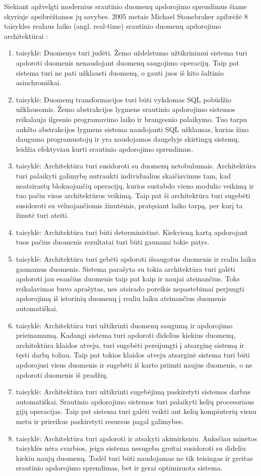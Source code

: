 \documentclass{VUMIFPSbakalaurinis}
\begin{document}
Siekiant apžvelgti modernius srautinio duomenų apdorojimo sprendimus šiame skyriuje apsibrėžiamos jų savybes.
2005 metais Michael Stonebraker apibrėžė 8 taisykles realaus laiko (angl. real-time) srautinio duomenų apdorojimo architektūrai \cite{stonebraker20058}:
\begin{enumerate}[label=\arabic*]
    \item taisyklė: Duomenys turi judėti. Žemo uždelstumo užtikrinimui sistema turi apdoroti duomenis nenaudojant duomenų saugojimo operacijų. 
    Taip pat sistema turi ne pati užklausti duomenų, o gauti juos iš kito šaltinio asinchroniškai. 
    \item taisyklė: Duomenų transformacijos turi būti vykdomas SQL pobūdžio užklausomis. Žemo abstrakcijos lygmens srautinio apdorojimo sistemos reikalauja ilgesnio programavimo laiko ir brangesnio palaikymo. Tuo tarpu aukšto abstrakcijos lygmens sistema naudojanti SQL užklausas, kurias žino dauguma programuotojų ir yra naudojamos daugelyje skirtingų sistemų, leidžia efektyviau kurti srautinio apdorojimo sprendimus.
    \item taisyklė: Architektūra turi susidoroti su duomenų netobulumais. Architektūra turi palaikyti galimybę nutraukti individualius skaičiavimus tam, kad neatsirastų blokuojančių operacijų, kurios sustabdo vieno modulio veikimą ir tuo pačiu visos architektūros veikimą. Taip pat ši architektūra turi sugebėti susidoroti su vėluojančiomis žinutėmis, pratęsiant laiko tarpą, per kurį ta žinutė turi ateiti.
    \item taisyklė: Architektūra turi būti deterministinė. Kiekvieną kartą apdorojant tuos pačius duomenis rezultatai turi būti gaunami tokie patys.
    \item taisyklė: Architektūra turi gebėti apdoroti išsaugotus duomenis ir realiu laiku gaunamus duomenis. Sistema parašyta su tokia architektūra turi galėti apdoroti jau esančius duomenis taip pat kaip ir naujai ateinančius. Toks reikalavimas buvo aprašytas, nes atsirado poreikis nepastebimai perjungti apdorojimą iš istorinių duomenų į realiu laiku ateinančius duomenis automatiškai.
    \item taisyklė: Architektūra turi užtikrinti duomenų saugumą ir apdorojimo prieinamumą. Kadangi sistema turi apdoroti didelius kiekius duomenų, architektūra klaidos atveju, turi sugebėti persijungti į atsarginę sistemą ir tęsti darbą toliau. Taip pat tokios klaidos atveju atsarginė sistema turi būti apdorojusi visus duomenis ir sugebėti iš karto priimti naujus duomenis, o ne apdoroti duomenis iš pradžių.
    \item taisyklė: Architektūra turi užtikrinti sugebėjimą paskirstyti sistemos darbus automatiškai. Srautinio apdorojimo sistemos turi palaikyti kelių procesoriaus gijų operacijas. Taip pat sistema turi galėti veikti ant kelių kompiuterių vienu metu ir prireikus paskirstyti resursus pagal galimybes.
    \item taisyklė: Architektūra turi apdoroti ir atsakyti akimirksniu. Anksčiau minėtos taisyklės nėra svarbios, jeigu sistema nesugeba greitai susidoroti su dideliu kiekiu naujų duomenų. Todėl turi būti naudojamas ne tik teisingas ir greitas srautinio apdorojimo sprendimas, bet ir gerai optimizuota sistema.
\end{enumerate}\par 
\end{document}
